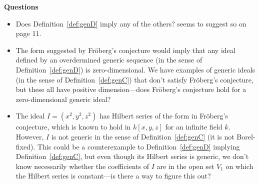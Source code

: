 \documentclass[11pt]{article}
\theoremstyle{definition}
\begin{document}
\noindent\Large{\textbf{Questions}}

\normalsize

\begin{itemize}[noitemsep]
	\item Does Definition~\ref{def:genD} imply any of the others? \cite{bigdeli2021semi} seems to suggest so on page 11.
	\item The form suggested by Fröberg's conjecture would imply that any ideal defined by an overdermined generic sequence (in the sense of Definition~\ref{def:genD}) is zero-dimensional. We have examples of generic ideals (in the sense of Definition~\ref{def:genC}) that don't satisfy Fröberg's conjecture, but these all have positive dimension---does Fröberg's conjecture hold for a zero-dimensional generic ideal?
	\item The ideal $I = (x^2, y^2, z^2)$ has Hilbert series of the form in Fröberg's conjecture, which is known to hold in $k[x,y,z]$ for an infinite field $k$. However, $I$ is not generic in the sense of Definition~\ref{def:genC} (it is not Borel-fixed). This could be a counterexample to Definition~\ref{def:genD} implying Definition~\ref{def:genC}, but even though its Hilbert series is generic, we don't know necessarily whether the coefficients of $I$ are in the open set $V_1$ on which the Hilbert series is constant---is there a way to figure this out?
\end{itemize}


\nocite{M2}
\nocite{sage}

\newpage


\end{document}

